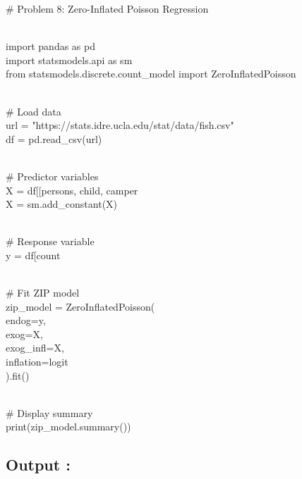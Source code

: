 \documentclass[
]{article}
\begin{document}
\# Problem 8: Zero-Inflated Poisson Regression\\
\strut \\
import pandas as pd\\
import statsmodels.api as sm\\
from statsmodels.discrete.count\_model import ZeroInflatedPoisson\\
\strut \\
\# Load data\\
url = "https://stats.idre.ucla.edu/stat/data/fish.csv"\\
df = pd.read\_csv(url)\\
\strut \\
\# Predictor variables\\
X = df{[}{[}\textquotesingle persons\textquotesingle,
\textquotesingle child\textquotesingle,
\textquotesingle camper\textquotesingle{]}{]}\\
X = sm.add\_constant(X)\\
\strut \\
\# Response variable\\
y = df{[}\textquotesingle count\textquotesingle{]}\\
\strut \\
\# Fit ZIP model\\
zip\_model = ZeroInflatedPoisson(\\
endog=y,\\
exog=X,\\
exog\_infl=X,\\
inflation=\textquotesingle logit\textquotesingle{}\\
).fit()\\
\strut \\
\# Display summary\\
print(zip\_model.summary())

\subsection{\texorpdfstring{\textbf{Output
:}}{Output :}}\label{output-7}
\end{document}
